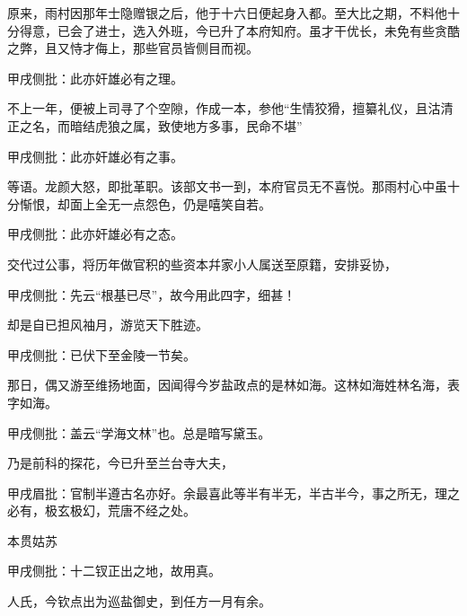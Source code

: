 \begin{parag}
    原来，雨村因那年士隐赠银之后，他于十六日便起身入都。至大比之期，不料他十分得意，已会了进士，选入外班，今已升了本府知府。虽才干优长，未免有些贪酷之弊，且又恃才侮上，那些官员皆侧目而视。\begin{note}甲戌侧批：此亦奸雄必有之理。\end{note}不上一年，便被上司寻了个空隙，作成一本，参他“生情狡猾，擅纂礼仪，且沽清正之名，而暗结虎狼之属，致使地方多事，民命不堪”\begin{note}甲戌侧批：此亦奸雄必有之事。\end{note}等语。龙颜大怒，即批革职。该部文书一到，本府官员无不喜悦。那雨村心中虽十分惭恨，却面上全无一点怨色，仍是嘻笑自若。\begin{note}甲戌侧批：此亦奸雄必有之态。\end{note}交代过公事，将历年做官积的些资本幷家小人属送至原籍，安排妥协，\begin{note}甲戌侧批：先云“根基已尽”，故今用此四字，细甚！\end{note}却是自已担风袖月，游览天下胜迹。\begin{note}甲戌侧批：已伏下至金陵一节矣。\end{note}
\end{parag}


\begin{parag}
    那日，偶又游至维扬地面，因闻得今岁盐政点的是林如海。这林如海姓林名海，表字如海。\begin{note}甲戌侧批：盖云“学海文林”也。总是暗写黛玉。\end{note}乃是前科的探花，今已升至兰台寺大夫，\begin{note}甲戌眉批：官制半遵古名亦好。余最喜此等半有半无，半古半今，事之所无，理之必有，极玄极幻，荒唐不经之处。\end{note}本贯姑苏\begin{note}甲戌侧批：十二钗正出之地，故用真。\end{note}人氏，今钦点出为巡盐御史，到任方一月有余。
\end{parag}


